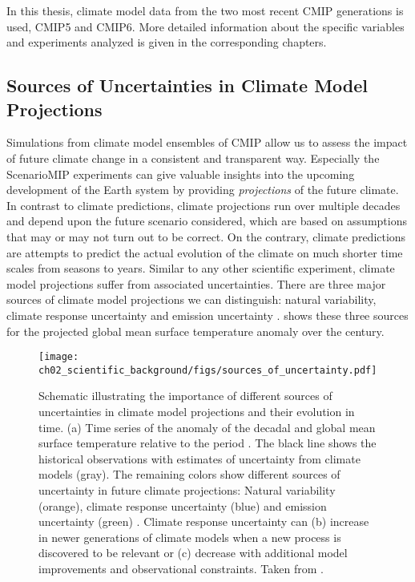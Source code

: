 In this thesis, climate model data from the two most recent \ac{CMIP}
generations is used, \acs{CMIP}5 and \acs{CMIP}6. More detailed information
about the specific variables and experiments analyzed is given in the
corresponding chapters.


\subsection{Sources of Uncertainties in Climate Model Projections}
\label{subsec:02:source_of_uncertainties}

Simulations from climate model ensembles of \ac{CMIP} allow us to assess the
impact of future climate change in a consistent and transparent way. Especially
the \ac{ScenarioMIP} experiments can give valuable insights into the upcoming
development of the Earth system by providing \emph{projections} of the future
climate. In contrast to climate predictions, climate projections run over
multiple decades and depend upon the future scenario considered, which are
based on assumptions that may or may not turn out to be correct. On the
contrary, climate predictions are attempts to predict the actual evolution of
the climate on much shorter time scales from seasons to years. Similar to any
other scientific experiment, climate model projections suffer from associated
uncertainties. There are three major sources of climate model projections we
can distinguish: natural variability, climate response uncertainty and emission
uncertainty \autocite{Hawkins2009, Hawkins2010}.
 shows these three sources for the
projected global mean surface temperature anomaly over the  century.

\begin{figure}[t]
  \centering
  \texttt{[image: 
    ch02\_scientific\_background/figs/sources\_of\_uncertainty.pdf]}
  \caption{Schematic illustrating the importance of different sources of
    uncertainties in climate model projections and their evolution in time. (a)
    Time series of the anomaly of the decadal and global mean surface
    temperature relative to the period . The black line
    shows the historical observations with estimates of uncertainty from
    climate models (gray). The remaining colors show different sources of
    uncertainty in future climate projections: Natural variability (orange),
    climate response uncertainty (blue) and emission uncertainty (green)
    \autocite{Hawkins2009, Hawkins2010}. Climate response uncertainty can (b)
    increase in newer generations of climate models when a new process is
    discovered to be relevant or (c) decrease with additional model
    improvements and observational constraints. Taken from
    \textcite{Cubasch2013}.}
  \label{fig:02:sources_of_uncertainty}
\end{figure}

